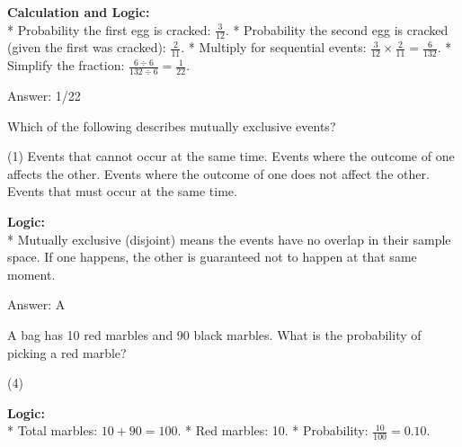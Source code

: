 \documentclass[11pt,paper=a4,answers]{exam}
\begin{document}
\begin{questions}
\begin{solution}
\textbf{Calculation and Logic:} \\
* Probability the first egg is cracked: $\frac{3}{12}$.
* Probability the second egg is cracked (given the first was cracked): $\frac{2}{11}$.
* Multiply for sequential events: $\frac{3}{12} \times \frac{2}{11} = \frac{6}{132}$.
* Simplify the fraction: $\frac{6 \div 6}{132 \div 6} = \frac{1}{22}$.

\vspace{30pt}

Answer: \colorbox{yellow!100}{1/22}
\end{solution}

\vspace{60pt}

\question
Which of the following describes mutually exclusive events?
\begin{tasks}(1)
    \task Events that cannot occur at the same time.
    \task Events where the outcome of one affects the other.
    \task Events where the outcome of one does not affect the other.
    \task Events that must occur at the same time.
\end{tasks}

\begin{solution}
\textbf{Logic:} \\
* Mutually exclusive (disjoint) means the events have no overlap in their sample space. If one happens, the other is guaranteed not to happen at that same moment.

\vspace{30pt}

Answer: \colorbox{yellow!100}{A}
\end{solution}

\vspace{60pt}

\question
A bag has 10 red marbles and 90 black marbles. What is the probability of picking a red marble?
\begin{tasks}(4)
\end{tasks}

\begin{solution}
\textbf{Logic:} \\
* Total marbles: $10 + 90 = 100$.
* Red marbles: 10.
* Probability: $\frac{10}{100} = 0.10$.


\end{solution}
\end{questions}
\end{document}

